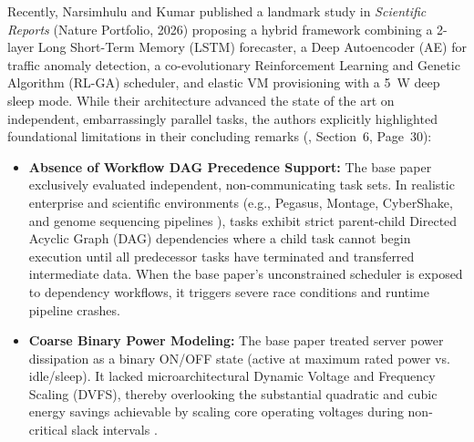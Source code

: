 \documentclass[default,sn-mathphys-num]{sn-jnl}
\theoremstyle{thmstyleone}
\theoremstyle{thmstyletwo}
\theoremstyle{thmstylethree}
\begin{document}
Recently, Narsimhulu and Kumar published a landmark study in \textit{Scientific Reports} (Nature Portfolio, 2026) \cite{narsimhulu2026hybrid} proposing a hybrid framework combining a 2-layer Long Short-Term Memory (LSTM) forecaster, a Deep Autoencoder (AE) for traffic anomaly detection, a co-evolutionary Reinforcement Learning and Genetic Algorithm (RL-GA) scheduler, and elastic VM provisioning with a 5~W deep sleep mode. While their architecture advanced the state of the art on independent, embarrassingly parallel tasks, the authors explicitly highlighted foundational limitations in their concluding remarks (\cite{narsimhulu2026hybrid}, Section~6, Page~30):
\begin{itemize}
    \item \textbf{Absence of Workflow DAG Precedence Support:} The base paper exclusively evaluated independent, non-communicating task sets. In realistic enterprise and scientific environments (e.g., Pegasus, Montage, CyberShake, and genome sequencing pipelines \cite{topcuoglu2002performance, da2012workflow}), tasks exhibit strict parent-child Directed Acyclic Graph (DAG) dependencies where a child task cannot begin execution until all predecessor tasks have terminated and transferred intermediate data. When the base paper's unconstrained scheduler is exposed to dependency workflows, it triggers severe race conditions and runtime pipeline crashes.
    \item \textbf{Coarse Binary Power Modeling:} The base paper treated server power dissipation as a binary ON/OFF state (active at maximum rated power vs. idle/sleep). It lacked microarchitectural Dynamic Voltage and Frequency Scaling (DVFS), thereby overlooking the substantial quadratic and cubic energy savings achievable by scaling core operating voltages during non-critical slack intervals \cite{devaraju2022dvfs}.
\end{itemize}
\end{document}
